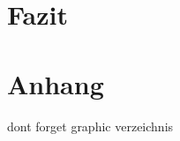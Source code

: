 \documentclass[12pt]{scrartcl} %
\begin{document}
\section{Fazit}


\newpage
\section{Anhang}
\thispagestyle{empty}

dont forget graphic verzeichnis


\newpage
\setlength{\bibitemsep}{\baselineskip}
\printbibliography[heading=bibintoc]
\thispagestyle{empty}
\end{document}
